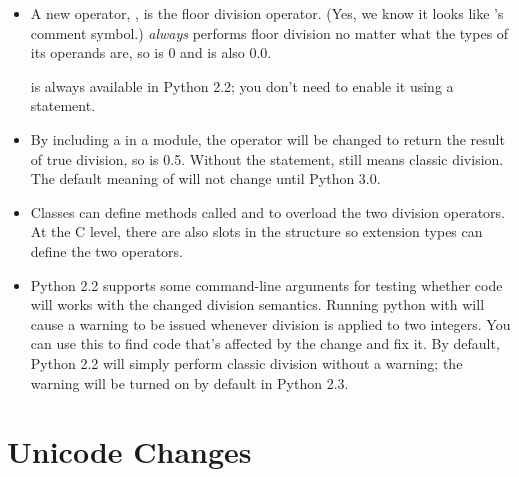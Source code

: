 \documentclass{howto}
\begin{document}
\begin{itemize}

\item A new operator, \code{//}, is the floor division operator.
(Yes, we know it looks like \Cpp's comment symbol.)  \code{//}
\emph{always} performs floor division no matter what the types of
its operands are, so  is 0 and  is also
0.0.

\code{//} is always available in Python 2.2; you don't need to enable
it using a  statement.  

\item By including a  in a
module, the \code{/} operator will be changed to return the result of
true division, so  is 0.5.  Without the 
statement, \code{/} still means classic division.  The default meaning
of \code{/} will not change until Python 3.0.  

\item Classes can define methods called  and
 to overload the two division operators.  At the
C level, there are also slots in the  structure
so extension types can define the two operators.

\item Python 2.2 supports some command-line arguments for testing
whether code will works with the changed division semantics.  Running
python with  will cause a warning to be issued
whenever division is applied to two integers.  You can use this to
find code that's affected by the change and fix it.  By default,
Python 2.2 will simply perform classic division without a warning; the
warning will be turned on by default in Python 2.3.

\end{itemize}

\begin{seealso}


\end{seealso}


\section{Unicode Changes}
\end{document}
